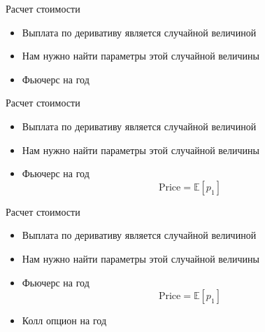 \documentclass{beamer}
\newcommand{\E}{\ensuremath{\mathbb{E}}}
\begin{document}
        \begin{frame}{Расчет стоимости}
            \begin{itemize}
                \item Выплата по деривативу является случайной величиной
                \item Нам нужно найти параметры этой случайной величины
            \end{itemize}
            \begin{itemize}
                \item Фьючерс на год
            \end{itemize}
        \end{frame}

        \begin{frame}{Расчет стоимости}
            \begin{itemize}
                \item Выплата по деривативу является случайной величиной
                \item Нам нужно найти параметры этой случайной величины
            \end{itemize}
            \begin{itemize}
                \item Фьючерс на год
                \[
                    \mathrm{Price} = \E \left[ p_1 \right]
                \]
            \end{itemize}
        \end{frame}

        \begin{frame}{Расчет стоимости}
            \begin{itemize}
                \item Выплата по деривативу является случайной величиной
                \item Нам нужно найти параметры этой случайной величины
            \end{itemize}
            \begin{itemize}
                \item Фьючерс на год
                \[
                    \mathrm{Price} = \E \left[ p_1 \right]
                \]
                \item Колл опцион на год
            \end{itemize}
        \end{frame}
\end{document}

